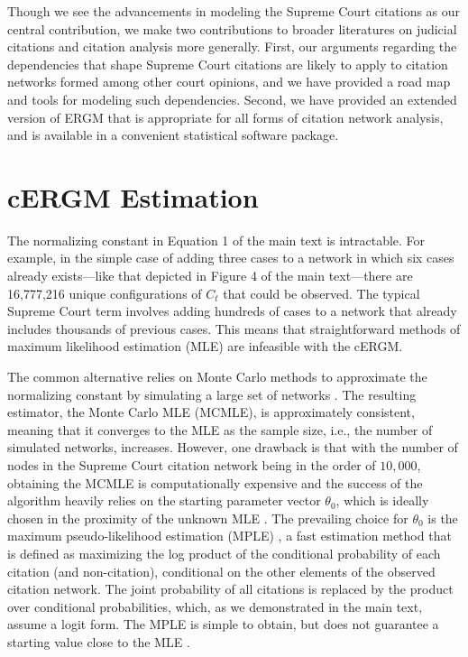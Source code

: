 \documentclass[headsepline=true, abstracton]{scrartcl}
\begin{document}
Though we see the advancements in modeling the Supreme Court citations as our central contribution, we make two contributions to broader literatures on judicial citations and citation analysis more generally. First, our arguments regarding the dependencies that shape Supreme Court citations are likely to apply to citation networks formed among other court opinions, and we have provided a road map and tools for modeling such dependencies. Second, we have provided an extended version of ERGM that is appropriate for all forms of citation network analysis, and is available in a convenient statistical software package.

\singlespacing
 


\onehalfspacing
\appendix
\section{cERGM Estimation}

The normalizing constant in Equation 1 of the main text is intractable. For example, in the simple case of adding three cases to a network in which six cases already exists---like that depicted in Figure 4 of the main text---there are 16,777,216 unique configurations of $C_t$ that could be observed. The typical Supreme Court term involves adding hundreds of cases to a network that already includes thousands of previous cases. This means that straightforward methods of maximum likelihood estimation (MLE) are infeasible with the cERGM. 

The common alternative relies on Monte Carlo methods to approximate the normalizing constant by simulating a large set of networks \citep{hunter2006inference,hummel2012improving}. The resulting estimator, the Monte Carlo MLE (MCMLE), is approximately consistent, meaning that it converges to the MLE as the sample size, i.e., the number of simulated networks, increases. However, one drawback is that with the number of nodes in the Supreme Court citation network being in the order of $10,000$, obtaining the MCMLE is computationally expensive \citep{schmid2017exponential} and the success of the algorithm heavily relies on the starting parameter vector $\theta_0$, which is ideally chosen in the proximity of the unknown MLE \citep{hummel2012improving}. The prevailing choice for $\theta_0$ is the maximum pseudo-likelihood estimation (MPLE) \citep{strauss1990pseudolikelihood}, a fast estimation method that is defined as maximizing the log product of the conditional probability of each citation (and non-citation), conditional on the other elements of the observed citation network. The joint probability of all citations is replaced by the product over conditional probabilities, which, as we demonstrated in the main text, assume a logit form. The MPLE is simple to obtain, but does not guarantee a starting value close to the MLE \citep{SchmidHunter2020}. 
\end{document}
